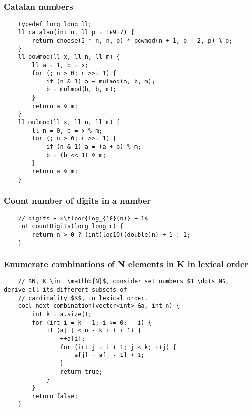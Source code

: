 \documentclass{article}
\begin{document}
\subsubsection{Catalan numbers}
\begin{verbatim}
    typedef long long ll;
    ll catalan(int n, ll p = 1e9+7) {
        return choose(2 * n, n, p) * powmod(n + 1, p - 2, p) % p;
    }
    ll powmod(ll x, ll n, ll m) {
        ll a = 1, b = x;
        for (; n > 0; n >>= 1) {
            if (n & 1) a = mulmod(a, b, m);
            b = mulmod(b, b, m);
        }
        return a % m;
    }
    ll mulmod(ll x, ll n, ll m) {
        ll n = 0, b = x % m;
        for (; n > 0; n >>= 1) {
            if (n & 1) a = (a + b) % m;
            b = (b << 1) % m;
        }
        return a % m;
    }
\end{verbatim}

\subsubsection{Count number of digits in a number}
\begin{verbatim}
    // digits = $\floor{log_{10}(n)} + 1$
    int countDigits(long long n) {
        return n > 0 ? (int)log10((double)n) + 1 : 1;
    }
\end{verbatim}

\subsubsection{Enumerate combinations of N elements in K in lexical order}
\begin{verbatim}
    // $N, K \in  \mathbb{N}$, consider set numbers $1 \dots N$, derive all its different subsets of 
    // cardinality $K$, in lexical order.
    bool next_combination(vector<int> &a, int n) {
        int k = a.size();
        for (int i = k - 1; i >= 0; --i) {
            if (a[i] < n - k + i + 1) {
                ++a[i];
                for (int j = i + 1; j < k; ++j) {
                    a[j] = a[j - 1] + 1;
                }
                return true;
            }
        }
        return false;
    }
\end{verbatim}
\end{document}
